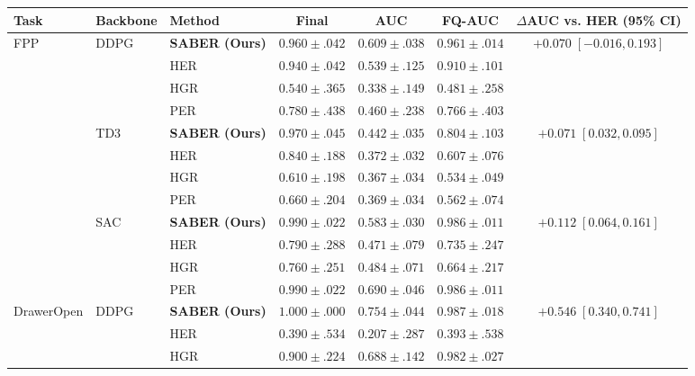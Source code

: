 \begin{table}[t]
\centering
\small
\setlength{\tabcolsep}{2pt}
\begin{tabular*}{\textwidth}{@{\extracolsep{\fill}}lllcccc@{}}
\toprule
Task & Backbone & Method & Final & AUC & FQ-AUC
  & \shortstack{$\Delta$AUC vs. HER\\(95\% CI)} \\
\midrule
FPP & DDPG & \textbf{SABER (Ours)}
  & \(\mathbf{0.960 \pm .042}\) & \(\mathbf{0.609 \pm .038}\)
  & \(\mathbf{0.961 \pm .014}\) & \(+0.070\;[-0.016,0.193]\) \\
 & & HER & \(0.940 \pm .042\) & \(0.539 \pm .125\) & \(0.910 \pm .101\) & \\
 & & HGR & \(0.540 \pm .365\) & \(0.338 \pm .149\) & \(0.481 \pm .258\) & \\
 & & PER & \(0.780 \pm .438\) & \(0.460 \pm .238\) & \(0.766 \pm .403\) & \\
\addlinespace[2pt]
 & TD3 & \textbf{SABER (Ours)}
  & \(\mathbf{0.970 \pm .045}\) & \(\mathbf{0.442 \pm .035}\)
  & \(\mathbf{0.804 \pm .103}\) & \(+0.071\;[0.032,0.095]\) \\
 & & HER & \(0.840 \pm .188\) & \(0.372 \pm .032\) & \(0.607 \pm .076\) & \\
 & & HGR & \(0.610 \pm .198\) & \(0.367 \pm .034\) & \(0.534 \pm .049\) & \\
 & & PER & \(0.660 \pm .204\) & \(0.369 \pm .034\) & \(0.562 \pm .074\) & \\
\addlinespace[2pt]
 & SAC & \textbf{SABER (Ours)}
  & \(\mathbf{0.990 \pm .022}\) & \(0.583 \pm .030\)
  & \(\mathbf{0.986 \pm .011}\) & \(+0.112\;[0.064,0.161]\) \\
 & & HER & \(0.790 \pm .288\) & \(0.471 \pm .079\) & \(0.735 \pm .247\) & \\
 & & HGR & \(0.760 \pm .251\) & \(0.484 \pm .071\) & \(0.664 \pm .217\) & \\
 & & PER & \(\mathbf{0.990 \pm .022}\) & \(\mathbf{0.690 \pm .046}\) & \(\mathbf{0.986 \pm .011}\) & \\
\midrule
DrawerOpen & DDPG & \textbf{SABER (Ours)}
  & \(\mathbf{1.000 \pm .000}\) & \(0.754 \pm .044\)
  & \(\mathbf{0.987 \pm .018}\) & \(+0.546\;[0.340,0.741]\) \\
 & & HER & \(0.390 \pm .534\) & \(0.207 \pm .287\) & \(0.393 \pm .538\) & \\
 & & HGR & \(0.900 \pm .224\) & \(0.688 \pm .142\) & \(0.982 \pm .027\) & \\

\end{tabular*}
\end{table}
